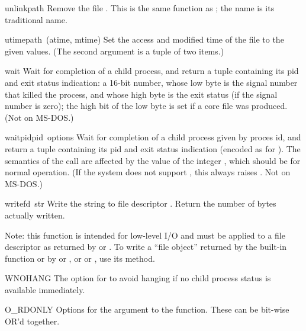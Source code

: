 \begin{funcdesc}{unlink}{path}
Remove the file .  This is the same function as ;
the  name is its traditional \UNIX{} name.
\end{funcdesc}

\begin{funcdesc}{utime}{path\, {\rm (}atime, mtime{\rm )}}
Set the access and modified time of the file to the given values.
(The second argument is a tuple of two items.)
\end{funcdesc}

\begin{funcdesc}{wait}{}
Wait for completion of a child process, and return a tuple containing
its pid and exit status indication: a 16-bit number, whose low byte is
the signal number that killed the process, and whose high byte is the
exit status (if the signal number is zero); the high bit of the low
byte is set if a core file was produced.  (Not on MS-DOS.)
\end{funcdesc}

\begin{funcdesc}{waitpid}{pid\, options}
Wait for completion of a child process given by proces id, and return
a tuple containing its pid and exit status indication (encoded as for
).  The semantics of the call are affected by the
value of the integer , which should be  for
normal operation.  (If the system does not support
, this always raises .  Not on
MS-DOS.)
\end{funcdesc}

\begin{funcdesc}{write}{fd\, str}
Write the string  to file descriptor .
Return the number of bytes actually written.

Note: this function is intended for low-level I/O and must be applied
to a file descriptor as returned by  or
.  To write a ``file object'' returned by the
built-in function  or by  or
, or  or , use
its  method.
\end{funcdesc}

\begin{datadesc}{WNOHANG}
The option for  to avoid hanging if no child
process status is available immediately.
\end{datadesc}


\begin{datadesc}{O_RDONLY}
Options for the  argument to the  function.
These can be bit-wise OR'd together.
\end{datadesc}
